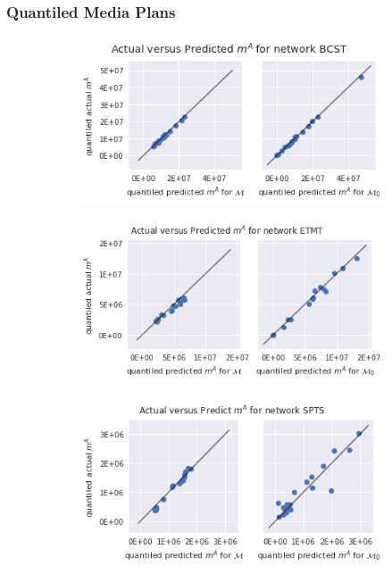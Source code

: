 \documentclass{beamer}
\begin{document}
\begin{frame}
\frametitle{Quantiled Media Plans}
    \begin{figure}[!h]
      \centering
      \begin{subfigure}[b]{.75\textwidth}
        \centering
        \includegraphics[scale=0.3]{BCST_quantiled}
      \end{subfigure}
      \begin{subfigure}[b]{.75\textwidth}
        \centering
        \includegraphics[scale=0.3]{ETMT_quantiled}
      \end{subfigure}
      \begin{subfigure}[b]{.75\textwidth}
        \centering
        \includegraphics[scale=0.3]{SPTS_quantiled}
      \end{subfigure}
    \end{figure}
\end{frame}
\end{document}
